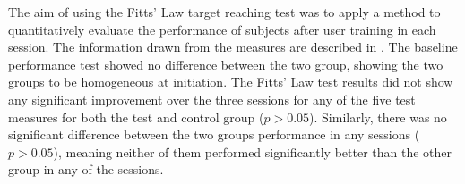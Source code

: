 The aim of using the Fitts' Law target reaching test was to apply a method to quantitatively evaluate the performance of subjects after user training in each session. The information drawn from the measures are described in . The baseline performance test showed no difference between the two group, showing the two groups to be homogeneous at initiation. The Fitts' Law test results did not show any significant improvement over the three sessions for any of the five test measures for both the test and control group ($p > 0.05$). Similarly, there was no significant difference between the two groups performance in any sessions ($p > 0.05$), meaning neither of them performed significantly better than the other group in any of the sessions.

%



